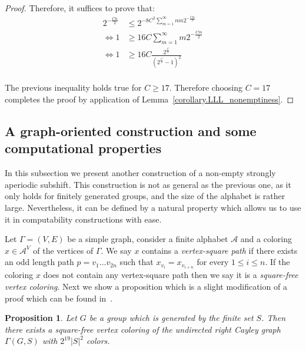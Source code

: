 \documentclass[letterpaper]{article}
\theoremstyle{plain}
\newtheorem{proposition}[theorem]{Proposition}
\def\ag{\mathcal{A}}
\newcommand{\define}[1]{\emph{#1}}
\newcommand{\cor}[2][]{#2}
\begin{document}
\begin{proof}
		
		Therefore, it suffices to prove that:
		\begin{align*}
		2^{-\frac{Cn}{2}} & \leq 2^{-8C^2 \sum_{m = 1}^{\infty}nm2^{-\frac{Cm}{2}} }\\
		\iff 1 & \geq  16C \sum_{m = 1}^{\infty}m2^{-\frac{Cm}{2}} \\
		\iff 1 & \geq  16C \frac{2^{\frac{C}{2}}}{(2^{\frac{C}{2}}-1)^2 } \\		
		\end{align*}
		
		The previous inequality holds true for $C \geq 17$. Therefore choosing $C = 17$ completes the proof by application of Lemma~\ref{corollary.LLL_nonemptiness}.\end{proof}
	
	
	
		\subsection{A graph-oriented construction and some computational properties}
		\label{subsection.strongly_aperiodic_subshifts_LLL}
		
		In this subsection we present another construction of a non-empty strongly aperiodic subshift. This construction is not as general as the previous one, as it only holds for finitely generated groups, and the size of the alphabet is rather large. Nevertheless, it can be defined by a natural property which allows us to use it in computability constructions with ease. 
		
		Let $\Gamma = (V,E)$ be a simple graph, consider a finite alphabet $\ag$ and a coloring $x \in \ag^{V}$ of the vertices of $\Gamma$. We say $x$ contains a \define{vertex-square path} if there exists an odd length path $p = v_1\dots v_{2n}$ such that $x_{v_i} = x_{v_{i+n}}$ for every $1 \leq i \leq n$. If the coloring $x$ does not contain any vertex-square path then we say it is a \define{square-free vertex coloring}. Next we show a proposition which is a slight modification of a proof which can be found in~\cor{\cite[Theorem~1]{alonetal_nonrepetitivecoloringofgraphs}}.
		
		\begin{proposition}\label{propositionsquarefreecoloringgraph}
			Let $G$ be a group which is generated by the finite set $S$. Then there exists a square-free vertex coloring of the undirected right Cayley graph $\Gamma(G,S)$ with $2^{19}|S|^2$ colors.
		\end{proposition}
		
\end{document}
